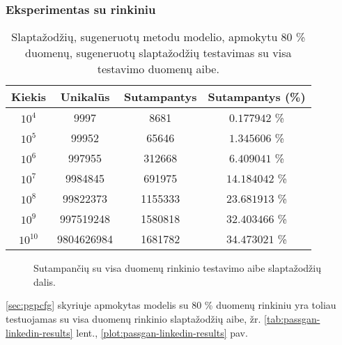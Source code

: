 \documentclass{VUMIFInfBakalaurinis}
\begin{document}
\subsubsection{Eksperimentas su  rinkiniu} %
\begin{table}[hb]
  \centering
  \caption{
    Slaptažodžių, sugeneruotų  metodu modelio, apmokytu 80 \% 
     duomenų, sugeneruotų slaptažodžių testavimas su visa
     testavimo duomenų aibe.
  }
  \begin{tabular}{|c|c|c|c|}
    \hline \textbf{Kiekis} & \textbf{Unikalūs} & \textbf{Sutampantys} & 
    \textbf{Sutampantys (\%)} \\
    \hline $10^4$ & 9997 & 8681 & $0.177942$ \% \\
    \hline $10^5$ & 99952 & 65646 & $1.345606$ \% \\
    \hline $10^6$ & 997955 & 312668 & $6.409041$ \% \\
    \hline $10^7$ & 9984845 & 691975 & $14.184042$ \% \\
    \hline $10^8$ & 99822373 & 1155333 & $23.681913$ \% \\
    \hline $10^9$ & 997519248 & 1580818 & $32.403466$ \% \\ 
    \hline $10^{10}$ & 9804626984 & 1681782 & $34.473021$ \% \\
    \hline
  \end{tabular}
  \label{tab:pcfg-linkedin-results}
\end{table}

\begin{figure}[!ht]
  \begin{center}
  \end{center}
  \caption{
    Sutampančių su visa  duomenų rinkinio testavimo aibe 
    slaptažodžių dalis.
  }
  \label{plot:pcfg-linkedin-results}
\end{figure}
\ref{sec:pgpcfg} skyriuje apmokytas modelis su 80 \%  duomenų 
rinkiniu yra toliau testuojamas su visa  duomenų rinkinio 
slaptažodžių aibe, žr. \ref{tab:passgan-linkedin-results} lent., 
\ref{plot:passgan-linkedin-results} pav.
\end{document}
